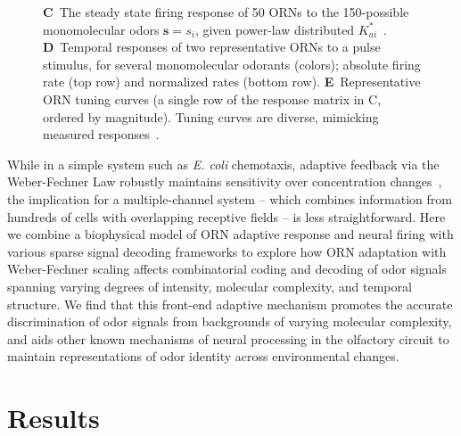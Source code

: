 \documentclass[9pt,twocolumn,twoside]{pnas-new}
\begin{document}
\begin{figure}[!tb]
{{		%
		\textbf{C}~The steady state firing response of 50 ORNs to the 150-possible monomolecular odors $\mathbf s = s_i$, given  power-law distributed $K^*_{ai}$~\cite{si2017invariances}.
		\textbf{D}~Temporal responses of two representative ORNs to a pulse stimulus, for several monomolecular odorants (colors); absolute firing rate (top row) and normalized rates (bottom row).
		\textbf{E}~Representative ORN tuning curves (a single row of the response matrix in C, ordered by magnitude). Tuning curves are diverse, mimicking measured responses~\cite{hallem_carlson}.
		}}
		\label{fig:tuning_curves}
\end{figure}

While in a simple system such as \textit{E. coli} chemotaxis, adaptive feedback via the Weber-Fechner Law robustly maintains sensitivity over concentration changes~\cite{robustness_alon,EmonetReview}, the implication for a multiple-channel system -- which combines information from hundreds of cells with overlapping receptive fields  -- is less straightforward. Here we combine a biophysical model of ORN adaptive response and neural firing with various sparse signal decoding frameworks to explore how ORN adaptation with Weber-Fechner scaling affects combinatorial coding and decoding of odor signals spanning varying degrees of intensity, molecular complexity, and temporal structure. We find that this front-end adaptive mechanism promotes the accurate discrimination of odor signals from backgrounds of varying molecular complexity, and aids other known mechanisms of neural processing in the olfactory circuit to maintain representations of odor identity across environmental changes. %


\section*{Results}



\end{document}
